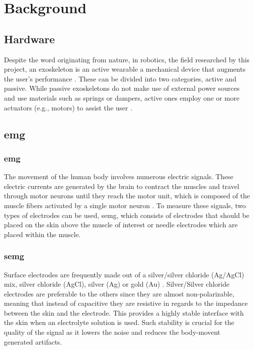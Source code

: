 \section{Background}
\label{section:background}

\subsection{Hardware}

Despite the word originating from nature, in robotics, the field researched by this project, an exoskeleton is an active wearable %
a mechanical device that augments the user's performance \cite{exodefinition}. These can be divided into two categories, active and passive. 
While passive exoskeletons do not make use of external power sources and use materials such as springs or dampers, active ones employ 
one or more actuators (e.g., motors) to assist the user \cite{passiveactiveexo}.


\subsection{\acrfull{emg}}

\subsubsection{\acrshort{emg}}

The movement of the human body involves numerous electric signals. These electric currents are generated by the brain
to contract the muscles and travel through motor neurons until they reach the motor unit, which is composed of the muscle fibers
activated by a single motor neuron \cite{emggen}. To measure these signals, two types of electrodes can be used, \acrfull{semg}, 
which consists of electrodes that should be placed on the skin above the muscle of interest or needle electrodes which are placed within 
the muscle. 

\subsubsection{\acrshort{semg}}

Surface electrodes are frequently made out of a silver/silver chloride (Ag/AgCl) mix, silver chloride (AgCl), silver (Ag) or gold (Au) \cite{sEMG}.
Silver/Silver chloride electrodes are preferable to the others since they are almost non-polarizable, meaning that instead of capacitive
they are resistive in regards to the impedance between the skin and the electrode. This provides a highly stable interface with the skin when 
an electrolyte solution is used. Such stability is crucial for the quality of the signal as it lowers the noise and reduces the body-movent generated
artifacts.

